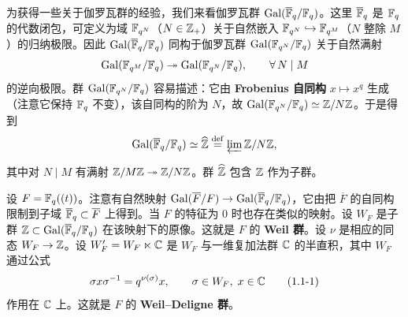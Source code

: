 
为获得一些关于伽罗瓦群的经验，我们来看伽罗瓦群 $\operatorname{Gal}(\overline{\mathbb{F}}_q/\mathbb{F}_q)$。这里 $\overline{\mathbb{F}}_q$ 是 $\mathbb{F}_q$ 的代数闭包，可定义为域 $\mathbb{F}_{q^N}$（$N\in\mathbb{Z}_+$）关于自然嵌入 $\mathbb{F}_{q^N}\hookrightarrow\mathbb{F}_{q^M}$（$N$ 整除 $M$）的归纳极限。因此 $\operatorname{Gal}(\overline{\mathbb{F}}_q/\mathbb{F}_q)$ 同构于伽罗瓦群 $\operatorname{Gal}(\mathbb{F}_{q^N}/\mathbb{F}_q)$ 关于自然满射
\[
    \operatorname{Gal}(\mathbb{F}_{q^M}/\mathbb{F}_q)\twoheadrightarrow\operatorname{Gal}(\mathbb{F}_{q^N}/\mathbb{F}_q),
    \qquad \forall\, N\mid M
\]
的逆向极限。群 $\operatorname{Gal}(\mathbb{F}_{q^N}/\mathbb{F}_q)$ 容易描述：它由 \textbf{Frobenius 自同构} $x\mapsto x^q$ 生成（注意它保持 $\mathbb{F}_q$ 不变），该自同构的阶为 $N$，故 $\operatorname{Gal}(\mathbb{F}_{q^N}/\mathbb{F}_q)\simeq\mathbb{Z}/N\mathbb{Z}$。于是得到
\[
    \operatorname{Gal}(\overline{\mathbb{F}}_q/\mathbb{F}_q)\simeq\widehat{\mathbb{Z}}
    \overset{\mathrm{def}}{=}\varprojlim\mathbb{Z}/N\mathbb{Z},
\]


其中对 $N\mid M$ 有满射 $\mathbb{Z}/M\mathbb{Z}\twoheadrightarrow\mathbb{Z}/N\mathbb{Z}$。群 $\widehat{\mathbb{Z}}$ 包含 $\mathbb{Z}$ 作为子群。

设 $F=\mathbb{F}_q((t))$。注意有自然映射 $\operatorname{Gal}(\overline{F}/F)\to\operatorname{Gal}(\overline{\mathbb{F}}_q/\mathbb{F}_q)$，它由把 $\overline{F}$ 的自同构限制到子域 $\overline{\mathbb{F}}_q\subset\overline{F}$ 上得到。当 $F$ 的特征为 $0$ 时也存在类似的映射。设 $W_F$ 是子群 $\mathbb{Z}\subset\operatorname{Gal}(\overline{\mathbb{F}}_q/\mathbb{F}_q)$ 在该映射下的原像。这就是 $F$ 的 \textbf{Weil 群}。设 $\nu$ 是相应的同态 $W_F\to\mathbb{Z}$。设 $W'_F=W_F\ltimes\mathbb{C}$ 是 $W_F$ 与一维复加法群 $\mathbb{C}$ 的半直积，其中 $W_F$ 通过公式
\begin{equation}
    \sigma x\sigma^{-1}=q^{\nu(\sigma)}x,\qquad \sigma\in W_F,\; x\in\mathbb{C}
    \tag{1.1-1}
\end{equation}
作用在 $\mathbb{C}$ 上。这就是 $F$ 的 \textbf{Weil--Deligne 群}。

